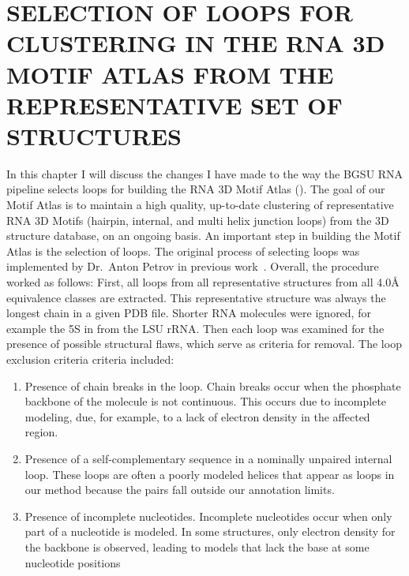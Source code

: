 \chapter{SELECTION OF LOOPS FOR CLUSTERING IN THE RNA 3D MOTIF ATLAS FROM THE
REPRESENTATIVE SET OF STRUCTURES}

In this chapter I will discuss the changes I have made to the way the BGSU RNA
pipeline selects loops for building the RNA 3D Motif Atlas
(). The goal of our Motif Atlas is to
maintain a high quality, up-to-date clustering of representative RNA 3D Motifs
(hairpin, internal, and multi helix junction loops) from the 3D structure
database, on an ongoing basis. An important step in building the Motif Atlas is
the selection of loops. The original process of selecting loops was implemented
by Dr.\ Anton Petrov in previous work~\cite{Petrov2012}. Overall, the procedure
worked as follows: First, all loops from all representative structures from all
4.0{\AA} equivalence classes are extracted. This representative structure was
always the longest chain in a given PDB file. Shorter RNA molecules were
ignored, for example the 5S in from the LSU rRNA\@. Then each loop was examined
for the presence of possible structural flaws, which serve as criteria for
removal. The loop exclusion criteria criteria included:

\begin{enumerate}
  \item Presence of chain breaks in the loop. Chain breaks occur when the
    phosphate backbone of the molecule is not continuous. This occurs due to
    incomplete modeling, due, for example, to a lack of electron density in the
    affected region.

  \item Presence of a self-complementary sequence in a nominally unpaired
    internal loop. These loops are often a poorly modeled helices that appear as
    loops in our method because the pairs fall outside our annotation limits.

  \item Presence of incomplete nucleotides. Incomplete nucleotides occur when
    only part of a nucleotide is modeled. In some structures, only electron
    density for the backbone is observed, leading to models that lack the base
    at some nucleotide positions
\end{enumerate}


